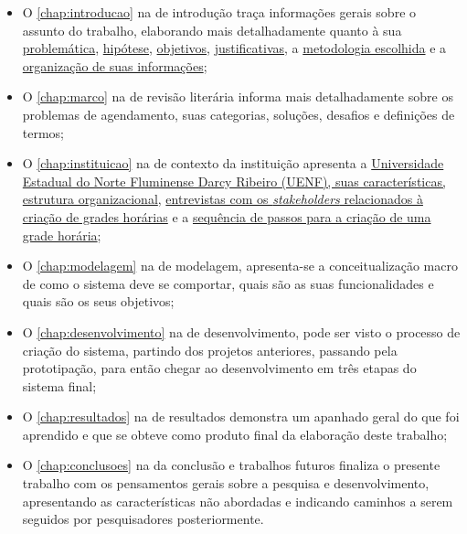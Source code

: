 \begin{itemize}
  \item O \autoref{chap:introducao} na  de introdução traça informações gerais sobre o assunto do trabalho, elaborando mais detalhadamente quanto à sua \hyperref[sec:Problemáticas]{problemática}, \hyperref[sec:Hipótese]{hipótese}, \hyperref[sec:Objetivos]{objetivos}, \hyperref[sec:Justificativas]{justificativas}, a \hyperref[sec:Metodologia]{metodologia escolhida} e a \hyperref[sec:Organização]{organização de suas informações};
  \item O \autoref{chap:marco} na  de revisão literária informa mais detalhadamente sobre os problemas de agendamento, suas categorias, soluções, desafios e definições de termos;
  \item O \autoref{chap:instituicao} na  de contexto da instituição apresenta a \hyperref[sec:estatuto]{Universidade Estadual do Norte Fluminense Darcy Ribeiro (UENF), suas características, estrutura organizacional}, \hyperref[sec:entrevistas]{entrevistas com os \textit{stakeholders} relacionados à criação de grades horárias} e a \hyperref[sec:sequencia]{sequência de passos para a criação de uma grade horária};
  \item O \autoref{chap:modelagem} na  de modelagem, apresenta-se a conceitualização macro de como o sistema deve se comportar, quais são as suas funcionalidades e quais são os seus objetivos;
  \item O \autoref{chap:desenvolvimento} na  de desenvolvimento, pode ser visto o processo de criação do sistema, partindo dos projetos anteriores, passando pela prototipação, para então chegar ao desenvolvimento em três etapas do sistema final;
  \item O \autoref{chap:resultados} na  de resultados demonstra um apanhado geral do que foi aprendido e que se obteve como produto final da elaboração deste trabalho;
  \item O \autoref{chap:conclusoes} na  da conclusão e trabalhos futuros finaliza o presente trabalho com os pensamentos gerais sobre a pesquisa e desenvolvimento, apresentando as características não abordadas e indicando caminhos a serem seguidos por pesquisadores posteriormente.
\end{itemize}
